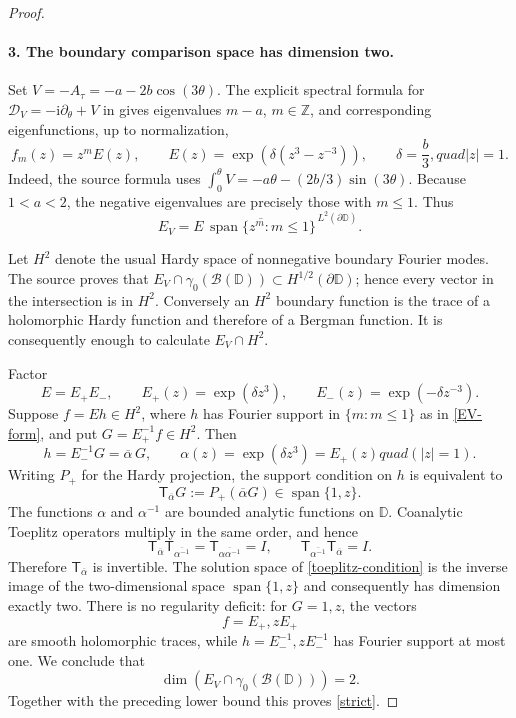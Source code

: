 \documentclass[11pt]{article}
\newcommand{\D}{\mathbb D}
\newcommand{\Berg}{\mathscr B}
\newcommand{\T}{\mathsf T}
\newcommand{\ii}{\mathrm i}
\newcommand{\Span}{\operatorname{span}}
\begin{document}
\begin{proof}
\paragraph{3. The boundary comparison space has dimension two.}
Set $V=-A_\tau=-a-2b\cos(3\theta)$.  The explicit spectral formula for
$\mathcal D_V=-\ii\partial_\theta+V$ in \cite[Proposition~3.1]{FFGKS}
gives eigenvalues $m-a$, $m\in\mathbb Z$, and corresponding eigenfunctions,
up to normalization,
\begin{equation}\label{eigenfunctions}
 f_m(z)=z^mE(z),\qquad
 E(z)=\exp\!\left(\delta(z^3-z^{-3})\right),
 \qquad \delta=\frac b3,quad |z|=1.
\end{equation}
Indeed, the source formula uses
$\int_0^\theta V=-a\theta-(2b/3)\sin(3\theta)$.
Because $1<a<2$, the negative eigenvalues are precisely those with $m\leq1$.
Thus
\begin{equation}\label{EV-form}
 E_V=E\,\overline{\Span\{z^m:m\leq1\}}^{\,L^2(\partial\D)}.
\end{equation}

Let $H^2$ denote the usual Hardy space of nonnegative boundary Fourier modes.
The source proves that
$E_V\cap\gamma_0(\Berg(\D))\subset H^{1/2}(\partial\D)$; hence every vector
in the intersection is in $H^2$.  Conversely an $H^2$ boundary function is
the trace of a holomorphic Hardy function and therefore of a Bergman
function.  It is consequently enough to calculate $E_V\cap H^2$.

Factor
\[
 E=E_+E_-,\qquad
 E_+(z)=\exp(\delta z^3),\qquad
 E_-(z)=\exp(-\delta z^{-3}).
\]
Suppose $f=Eh\in H^2$, where $h$ has Fourier support in $\{m:m\leq1\}$ as
in \eqref{EV-form}, and put $G=E_+^{-1}f\in H^2$.  Then
\[
 h=E_-^{-1}G=\overline{\alpha}\,G,
 \qquad \alpha(z)=\exp(\delta z^3)=E_+(z)quad(|z|=1).
\]
Writing $P_+$ for the Hardy projection, the support condition on $h$ is
equivalent to
\begin{equation}\label{toeplitz-condition}
 \T_{\overline\alpha}G
 :=P_+(\overline\alpha G)\in\Span\{1,z\}.
\end{equation}
The functions $\alpha$ and $\alpha^{-1}$ are bounded analytic functions on
$\D$.  Coanalytic Toeplitz operators multiply in the same order, and hence
\[
 \T_{\overline\alpha}\T_{\overline{\alpha^{-1}}}
 =\T_{\overline{\alpha\alpha^{-1}}}=I,
 \qquad
 \T_{\overline{\alpha^{-1}}}\T_{\overline\alpha}=I.
\]
Therefore $\T_{\overline\alpha}$ is invertible.  The solution space of
\eqref{toeplitz-condition} is the inverse image of the two-dimensional space
$\Span\{1,z\}$ and consequently has dimension exactly two.  There is no
regularity deficit: for $G=1,z$, the vectors
\[
 f=E_+, zE_+
\]
are smooth holomorphic traces, while
$h=E_-^{-1},zE_-^{-1}$ has Fourier support at most one.  We conclude that
\[
 \dim\!\left(E_V\cap\gamma_0(\Berg(\D))\right)=2.
\]
Together with the preceding lower bound this proves \eqref{strict}.
\end{proof}
\end{document}
